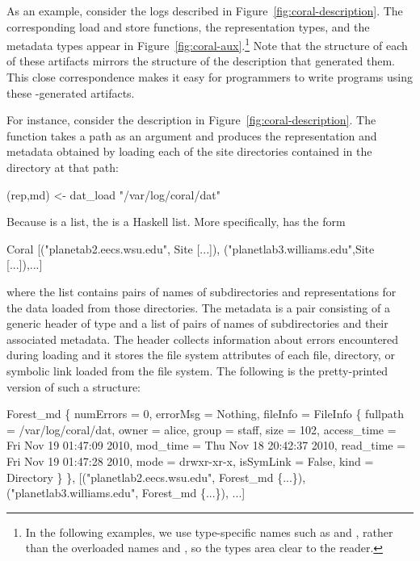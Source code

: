 As an example, consider the \coral{} logs described in
Figure~\ref{fig:coral-description}.  The corresponding load and store
functions, the representation types, and the metadata types appear in
Figure~\ref{fig:coral-aux}.\footnote{In the following examples, we use
  type-specific names such as  and
  , rather than the overloaded names  and ,
  so the types area clear to the reader.}
Note that the structure of each of these
artifacts mirrors the structure of the \forest{}
description that generated them. This close correspondence makes it
easy for programmers to write programs using these \forest{}-generated
artifacts.

%
For instance, consider the  description in
Figure~\ref{fig:coral-description}. The  function takes
a path as an argument and produces the representation and metadata
obtained by loading each of the site directories contained in the
directory at that path:
%
\begin{code}
(rep,md) <- dat_load "/var/log/coral/dat"
\end{code}
Because  is a \forest{} list, the  is a Haskell
list. More specifically,  has the form
\begin{code}
Coral [("planetab2.eecs.wsu.edu", Site [...]),
       ("planetlab3.williams.edu",Site [...]),...]
\end{code}
where the list contains pairs of names of subdirectories and
representations for the data loaded from those directories. The
metadata is a pair consisting of a generic header of type
 and a list of pairs of names of subdirectories and
their associated metadata. The header collects information
about errors encountered during loading and it stores the file system
attributes of each file, directory, or symbolic link loaded from the
file system.  The following is the pretty-printed version of such a
structure: 
%
\begin{code}
Forest_md 
  \{ numErrors = 0, 
    errorMsg = Nothing, 
    fileInfo = FileInfo
      \{ fullpath = /var/log/coral/dat, 
        owner = alice, group = staff, size = 102, 
        access_time = Fri Nov 19 01:47:09 2010, 
        mod_time = Thu Nov 18 20:42:37 2010, 
        read_time = Fri Nov 19 01:47:28 2010, 
        mode = drwxr-xr-x, isSymLink = False, 
        kind = Directory \} \},
[("planetlab2.eecs.wsu.edu", Forest_md \{...\}),
 ("planetlab3.williams.edu", Forest_md \{...\}), ...]
\end{code}


